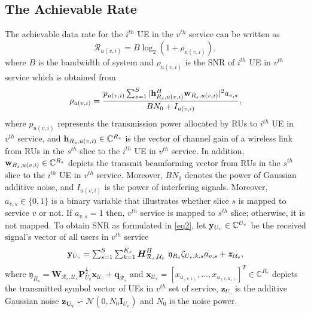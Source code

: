 \documentclass[conference]{IEEEtran}
\begin{document}
\subsection{The Achievable Rate}
The achievable data rate for the $i^{th}$ UE in the $v^{th}$ service can be written as
\begin{equation}\label{eq1}
\mathcal{R}_{u(v,i)} = B \log_2({1+ \rho_{u(v,i)}}),
\end{equation}
where $B$ is the bandwidth of system and $\rho_{u(v,i)}$ is the SNR of $i^{th}$ UE in $v^{th}$ service which is obtained from
\begin{equation}\label{eq2}
\rho_{u(v,i)} =  \frac{p_{u(v,i)}\sum_{s=1}^{S}|\bold{h}_{R_s,u(v,i)}^H \bold{w}_{R_s,u(v,i)}|^2 a_{v,s}}{BN_0 + I_{u(v,i)}},
\end{equation}
where $p_{u(v,i)}$ represents the transmission power allocated by RUs to $i^{th}$ UE in $v^{th}$ service, and
$\bold{h}_{R_s,u(v,i)} \in \mathbb{C}^{{R}_s}$ is the vector of channel gain of a wireless link from RUs in the $s^{th}$ slice to the $i^{th}$ UE in $v^{th}$ service. In addition, $\bold{w}_{R_s,u(v,i)} \in \mathbb{C}^{{R}_s}$ depicts the  transmit beamforming vector from RUs in the $s^{th}$ slice to the $i^{th}$ UE in $v^{th}$ service. Moreover, $BN_0$ denotes the power of Gaussian additive noise, and $I_{u(v,i)}$ is the power of interfering signals. Moreover, $a_{v,s} \in \{0,1\}$ is a binary variable that illustrates whether slice $s$ is mapped to service $v$ or not. If $a_{v,s} =1$ then, $v^{th}$ service is mapped to $s^{th}$ slice; otherwise, it is not mapped.
\newline
To obtain SNR as formulated in \eqref{eq2}, let $\bold{y}_{U_v}\in \mathbb{C}^{U_v} $ be the received signal's vector of all users in $v^{th}$ service
\begin{equation}\label{eq3}
\textstyle \bold{y}_{U_v} = \sum_{s = 1}^{S}\sum_{k=1}^{K_s} \boldsymbol{H}^H_{\mathcal{R}_s,\mathcal{U}_v} \
\mathfrak{y}_{R_s}\zeta_{U_v,k,s} a_{v,s}+ \boldsymbol{z}_{\mathcal{U}_v},
\end{equation}
where $\mathfrak{y}_{R_s} = \boldsymbol{W}_{\mathcal{R}_s,\mathcal{U}_v}\boldsymbol{P}_{U_v}^{\frac{1}{2}}\boldsymbol{x}_{\mathcal{U}_v}+ \boldsymbol{q}_{\mathcal{R}_s}$
and $\boldsymbol{x}_{ \mathcal{U}_v} = [x_{ u_{(v,1)}},...,x_{ u_{(v,\mathcal{U}_v)}}]^T \in \mathbb{C}^{{R}_s } $ depicts the transmitted symbol vector of UEs in $v^{th}$ set of service,  $\boldsymbol{z}_{U_v}$ is the additive Gaussian noise $\boldsymbol{z_{U_v}} \backsim \mathcal{N}(0,N_0\boldsymbol{I}_{{U}_v})$ and $N_0$ is the noise power.
\end{document}
